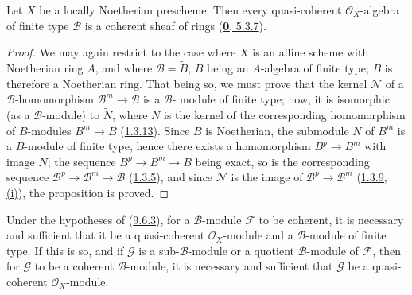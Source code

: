 \begin{proposition}[9.6.3]
\label{I.9.6.3}
Let $X$ be a locally Noetherian prescheme. Then every quasi-coherent
$\mathscr{O}_X$-algebra of finite type $\mathscr{B}$ is a coherent sheaf of
rings \textup{(\hyperref[0.5.3.7]{\textbf{0}, 5.3.7})}.
\end{proposition}

\begin{proof}
We may again restrict to the case where $X$ is an affine scheme with
Noetherian ring $A$, and where $\mathscr{B}=\widetilde{B}$, $B$ being an
$A$-algebra of finite type; $B$ is therefore a Noetherian ring. That being
so, we must prove that the kernel $\mathscr{N}$ of a
$\mathscr{B}$-homomorphism $\mathscr{B}^m\to\mathscr{B}$ is a
$\mathscr{B}$-
module of finite type; now, it is isomorphic (as a
$\mathscr{B}$-module) to $\widetilde{N}$, where $N$ is the kernel of the
corresponding homomorphism of $B$-modules $B^m\to B$
(\hyperref[I.1.3.13]{1.3.13}). Since $B$ is Noetherian, the submodule
$N$ of $B^m$ is a $B$-module of finite type, hence there exists a
homomorphism $B^p\to B^m$ with image $N$; the sequence $B^p\to B^m\to B$
being exact, so is the corresponding sequence
$\mathscr{B}^p\to\mathscr{B}^m\to\mathscr{B}$
(\hyperref[I.1.3.5]{1.3.5}), and since $\mathscr{N}$ is the image of
$\mathscr{B}^p\to\mathscr{B}^m$
(\hyperref[I.1.3.9]{1.3.9, (i)}), the proposition is proved.
\end{proof}

\begin{corollary}[9.6.4]
\label{I.9.6.4}
Under the hypotheses of \textup{(\hyperref[I.9.6.3]{9.6.3})}, for a
$\mathscr{B}$-module $\mathscr{F}$ to be coherent, it is necessary and
sufficient that it be a quasi-coherent $\mathscr{O}_X$-module and a
$\mathscr{B}$-module of finite type. If this is so, and if $\mathscr{G}$
is a sub-$\mathscr{B}$-module or a quotient $\mathscr{B}$-module of
$\mathscr{F}$, then for $\mathscr{G}$ to be a coherent $\mathscr{B}$-module,
it is necessary and sufficient that $\mathscr{G}$ be a quasi-coherent
$\mathscr{O}_X$-module.
\end{corollary}

